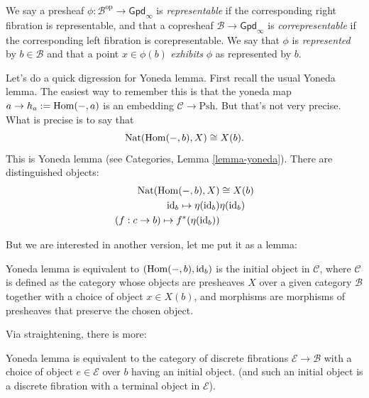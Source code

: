 \begin{definition}
\label{definition-representable-presheaf}
We say a presheaf
$\phi:\mathcal{B}^{\text{op}}\to
\mathsf{Gpd}_{\infty}$
is {\it representable} if the corresponding
right fibration
is representable, and that a copresheaf
$\mathcal{B}\to \mathsf{Gpd}_{\infty}$ is {\it
correpresentable}
if the corresponding left fibration is
corepresentable.
We say that $\phi$ is {\it represented} by $b
\in \mathcal{B}$
and that a point $x \in \phi(b)$ {\it
exhibits} $\phi$
as represented by $b$.
\end{definition}

\medskip\noindent
Let's do a quick digression for Yoneda lemma.
First recall the usual Yoneda lemma.
The easiest way to remember this is that
the yoneda map $a \to h_a:=\mathop{\mathrm{Hom}}\nolimits(-,a)$ is an
embedding $\mathcal{C} \to \text{Psh}$.
But that's not very precise.
What is precise is to say that
$$
\text{Nat}(\mathop{\mathrm{Hom}}\nolimits(-,b),X) \cong X(b).
$$
This is Yoneda lemma (see Categories, Lemma
\ref{lemma-yoneda}).
There are distinguished objects:
$$
\begin{aligned}
\text{Nat}(\mathop{\mathrm{Hom}}\nolimits(-,b),X)&\cong X(b)\\
\text{id}_b \mapsto \eta(\text{id}_b)&
\eta(\text{id}_b)\\
(f:c \to b) \mapsto f^*(\eta(\text{id}_b))&
\end{aligned}
$$

\noindent
But we are interested in another version,
let me put it as a lemma:

\begin{lemma}
\label{lemma-yoned-equiv-presh-categ}
Yoneda lemma is equivalent to
$(\mathop{\mathrm{Hom}}\nolimits(-,b),\text{id}_b)$ is
the initial object in $\mathcal{C}$, where
$\mathcal{C}$ is defined as the
category whose objects are presheaves $X$
over a given category $\mathcal{B}$ together
with a
choice of object $x \in X(b)$,
and morphisms are morphisms of presheaves
that preserve the
chosen object.
\end{lemma}

\noindent
Via straightening, there is more:

\begin{lemma}
\label{lemma-yoneda-equivalence-fibrations}
Yoneda lemma is equivalent
to the category of discrete fibrations
$\mathcal{E} \to \mathcal{B}$
with a choice of object $e \in \mathcal{E}$
over $b$
having an initial object.
(and such an initial object is a discrete
fibration
with a terminal object in $\mathcal{E}$).
\end{lemma}

